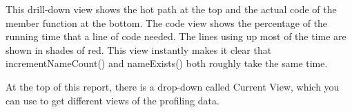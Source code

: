 This drill-down view shows the hot path at the top and the actual code of the member function at the bottom. The code view shows the percentage of the running time that a line of code needed. The lines using up most of the time are shown in shades of red. This view instantly makes it clear that incrementNameCount() and nameExists() both roughly take the same time.

At the top of this report, there is a drop-down called Current View, which you can use to get different views of the profiling data.





